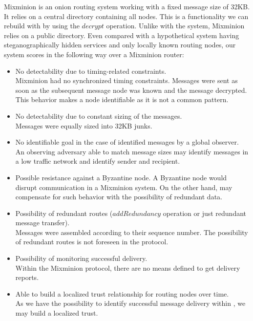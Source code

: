 Mixminion is an onion routing system working with a fixed message size of 32KB. It relies on a central directory containing all nodes. This is a functionality we can rebuild with \MessageVortex{} by using the $decrypt$ operation. Unlike with the \MessageVortex{} system, Mixminion relies on a public directory. Even compared with a hypothetical system having steganographically hidden services and only locally known routing nodes, our system scores in the following way over a Mixminion router:

\begin{itemize}
	\item No detectability due to timing-related constraints.\\
	Mixminion had no synchronized timing constraints. Messages were sent as soon as the subsequent message node was known and the message decrypted. This behavior makes a node identifiable as it is not a common pattern.
	\item No detectability due to constant sizing of the messages.\\
	Messages were equally sized into 32KB junks.%
	\item No identifiable goal in the case of identified messages by a global observer.\\
	An observing adversary able to match message sizes may identify messages in a low traffic network and identify sender and recipient. 
	\item Possible resistance against a Byzantine node.
	A Byzantine node would disrupt communication in a Mixminion system. On the other hand, \MessageVortex{} may compensate for such behavior with the possibility of redundant data.
	\item Possibility of redundant routes ($addRedundancy$ operation or just redundant message transfer).\\
	Messages were assembled according to their sequence number. The possibility of redundant routes is not foreseen in the protocol.
	\item Possibility of monitoring successful delivery.\\
	Within the Mixminion protocol, there are no means defined to get delivery reports.
	\item Able to build a localized trust relationship for routing nodes over time.\\
	As we have the possibility to identify successful message delivery within \MessageVortex{}, we may build a localized trust.
\end{itemize}

